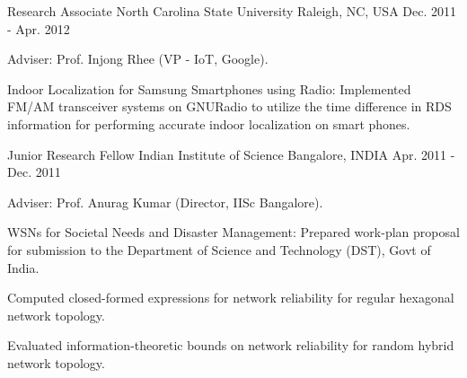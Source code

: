 \begin{cventries}
  \cventry
    {Research Associate} %
    {North Carolina State University} %
    {Raleigh, NC, USA} %
    {Dec. 2011 - Apr. 2012} %
    {
      \begin{cvitems} %
      \item {Adviser: Prof. Injong Rhee (VP - IoT, Google).}
%      
      \item {Indoor Localization for Samsung Smartphones using Radio: Implemented FM/AM transceiver systems on GNURadio to utilize the time difference in RDS information for performing accurate indoor localization on smart phones.}
%      
      \end{cvitems}
    }
    
  \cventry
    {Junior Research Fellow} %
    {Indian Institute of Science} %
    {Bangalore, INDIA} %
    {Apr. 2011 - Dec. 2011} %
    {
      \begin{cvitems} %
      \item {Adviser: Prof. Anurag Kumar (Director, IISc Bangalore).}
%      
      \item {WSNs for Societal Needs and Disaster Management: Prepared work-plan proposal for submission to the Department of Science and Technology (DST), Govt of India.}
      \item {Computed closed-formed expressions for network reliability for regular hexagonal network topology.}
      \item {Evaluated information-theoretic bounds on network reliability for random hybrid network topology.}
%      
      \end{cvitems}
    }


\end{cventries}
